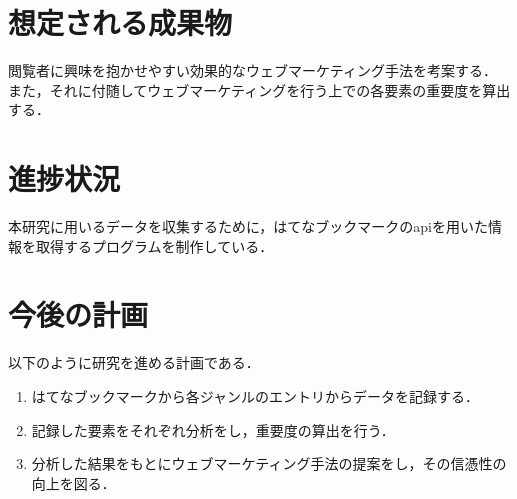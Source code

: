 \documentclass[uplatex,twocolumn,dvipdfmx]{jsarticle}
\begin{document}
\section{想定される成果物}

閲覧者に興味を抱かせやすい効果的なウェブマーケティング手法を考案する．
また，それに付随してウェブマーケティングを行う上での各要素の重要度を算出する．


\section{進捗状況}

本研究に用いるデータを収集するために，はてなブックマークのapiを用いた情報を取得するプログラムを制作している．

\section{今後の計画}
以下のように研究を進める計画である．

\begin{enumerate}
\item はてなブックマークから各ジャンルのエントリからデータを記録する．
\item 記録した要素をそれぞれ分析をし，重要度の算出を行う．
\item 分析した結果をもとにウェブマーケティング手法の提案をし，その信憑性の向上を図る．
\end{enumerate}



\end{document}
